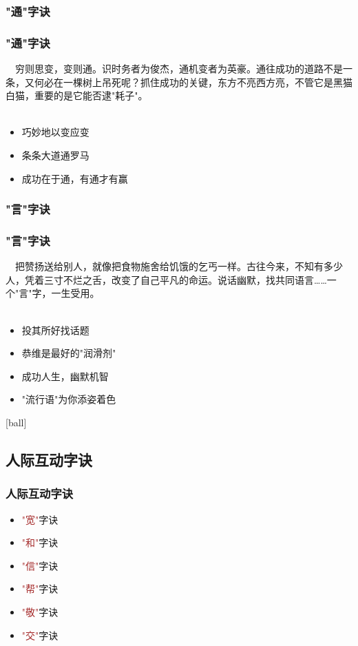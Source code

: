 \subsubsection{"通"字诀}
\begin{frame}
\frametitle{"通"字诀}
\noindent\handr~~穷则思变，变则通。识时务者为俊杰，通机变者为英豪。通往成功的道路不是一条，又何必在一棵树上吊死呢？抓住成功的关键，东方不亮西方亮，不管它是黑猫白猫，重要的是它能否逮"耗子"。
~\\
~\\
\begin{itemize}
    \item 巧妙地以变应变
    \item 条条大道通罗马
    \item 成功在于通，有通才有赢
\end{itemize}
\end{frame}

\subsubsection{"言"字诀}
\begin{frame}
\frametitle{"言"字诀}
\noindent\handr~~把赞扬送给别人，就像把食物施舍给饥饿的乞丐一样。古往今来，不知有多少人，凭着三寸不烂之舌，改变了自己平凡的命运。说话幽默，找共同语言……一个"言"字，一生受用。
~\\
~\\
\begin{itemize}
    \item 投其所好找话题
    \item 恭维是最好的"润滑剂"
    \item 成功人生，幽默机智
    \item "流行语"为你添姿着色
\end{itemize}
\end{frame}

[ball]

\subsection{人际互动字诀}
\begin{frame}
\frametitle{人际互动字诀}
\begin{itemize}
    \item \textcolor{brown}{"宽"}字诀
    \item \textcolor{brown}{"和"}字诀
    \item \textcolor{brown}{"信"}字诀
    \item \textcolor{brown}{"帮"}字诀
    \item \textcolor{brown}{"敬"}字诀
    \item \textcolor{brown}{"交"}字诀
\end{itemize}
\end{frame}

